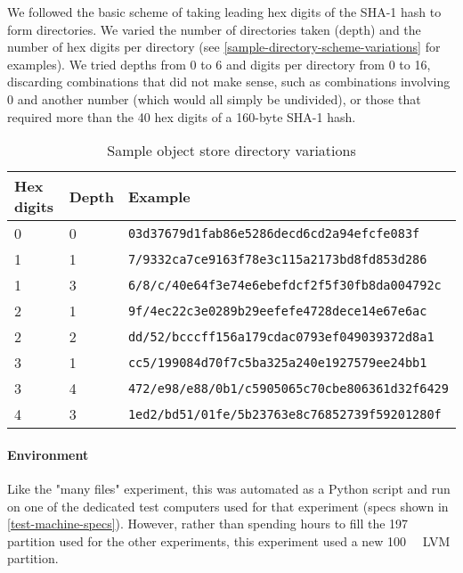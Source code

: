 We followed the basic scheme of taking leading hex digits of the SHA-1 hash to
form directories. We varied the number of directories taken (depth) and the
number of hex digits per directory (see
\autoref{sample-directory-scheme-variations} for examples). We tried depths from
\num{0} to \num{6} and digits per directory from \num{0} to \num{16}, discarding
combinations that did not make sense, such as combinations involving \num{0} and
another number (which would all simply be undivided), or those that required
more than the \num{40} hex digits of a \num{160}-byte SHA-1 hash.

\begin{table}[]
    \caption{Sample object store directory variations}
    \label{sample-directory-scheme-variations}
    \centering
    \begin{tabular}{l l l}
        Hex digits & Depth & Example \\
        \midrule
        0 & 0 & \lstinline{03d37679d1fab86e5286decd6cd2a94efcfe083f} \\
        1 & 1 & \lstinline{7/9332ca7ce9163f78e3c115a2173bd8fd853d286} \\
        1 & 3 & \lstinline{6/8/c/40e64f3e74e6ebefdcf2f5f30fb8da004792c} \\
        2 & 1 & \lstinline{9f/4ec22c3e0289b29eefefe4728dece14e67e6ac} \\
        2 & 2 & \lstinline{dd/52/bcccff156a179cdac0793ef049039372d8a1} \\
        3 & 1 & \lstinline{cc5/199084d70f7c5ba325a240e1927579ee24bb1} \\
        3 & 4 & \lstinline{472/e98/e88/0b1/c5905065c70cbe806361d32f6429} \\
        4 & 3 & \lstinline{1ed2/bd51/01fe/5b23763e8c76852739f59201280f} \\
    \end{tabular}
\end{table}

\paragraph{Environment}

Like the "many files" experiment, this was automated as a Python script and run
on one of the dedicated test computers used for that experiment (specs shown in
\autoref{test-machine-specs}). However, rather than spending hours to fill the
\SI{197}{\gibi\byte} partition used for the other experiments, this experiment
used a new \SI{100}{\mebi\byte} LVM partition.

